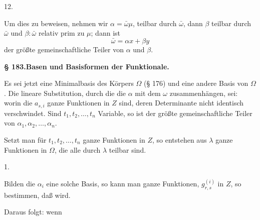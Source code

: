 12. 

Um dies zu beweisen, nehmen wir $\alpha = \bar\omega \mu$, teilbar durch $\bar\omega$,
dann $\beta$ teilbar durch $\bar\omega$ und $\beta : \bar\omega$ relativ prim zu $\mu$; dann ist
\[
\bar\omega = \alpha x + \beta y
\]
der größte gemeinschaftliche Teiler von $\alpha$ und $\beta$.

\begin{center}
\textbf{§ 183.\qquad Basen und Basisformen der Funktionale.}
\end{center}

Es sei jetzt
eine Minimalbasis des Körpers $\Omega$ (§ 176) und
eine andere Basis von $\Omega$. Die lineare Substitution, durch die
die $\alpha$ mit dem $\omega$ zusammenhängen, sei:
worin die $a_{s,i}$ ganze Funktionen in $Z$ sind, deren Determinante
nicht identisch verschwindet. Sind $t_1, t_2, \ldots, t_n$ Variable, so ist
der größte gemeinschaftliche Teiler von $\alpha_1, \alpha_2, \ldots, \alpha_n$.

Setzt man für $t_1, t_2, \ldots, t_n$ ganze Funktionen in $Z$, so entstehen
 aus $\lambda$ ganze Funktionen in $\Omega$, die alle durch $\lambda$ teilbar sind.

1. 

Bilden die $\alpha_i$ eine solche Basis, so kann man ganze Funktionen,
$g_{r,s}^{(i)}$ in $Z$, so bestimmen, daß
wird.

Daraus folgt:
wenn
